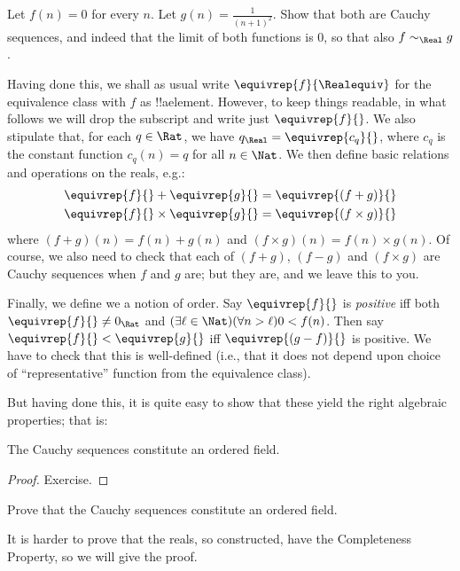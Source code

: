 \begin{prob}
Let $f(n) = 0$ for every $n$. Let $g(n) = \frac{1}{(n+1)^2}$. Show
that both are Cauchy sequences, and indeed that the limit of both
functions is $0$, so that also $f \sim_\Real g$. 
\end{prob}

Having done this, we shall as usual write $\equivrep{f}{\Realequiv}$
for the equivalence class with $f$ as !!a{element}. However, to keep
things readable, in what follows we will drop the subscript and write
just $\equivrep{f}{}$. We also stipulate that, for each $q \in \Rat$,
we have $q_{\Real} = \equivrep{c_{q}}{}$, where $c_{q}$ is the
constant function $c_q(n) = q$ for all $n \in \Nat$. We then define
basic relations and operations on the reals, e.g.:
\begin{align*}
	\equivrep{f}{} + \equivrep{g}{} &= 	\equivrep{(f + g)}{} \\
	\equivrep{f}{} \times 	\equivrep{g}{} &= \equivrep{(f \times g)}{} 
\end{align*}
where $(f + g)(n) = f(n) + g(n)$ and $(f \times g)(n) = f(n) \times
g(n)$. Of course, we also need to check that each of  $(f + g)$,
$(f-g)$ and $(f\times g)$ are Cauchy sequences when $f$ and $g$ are;
but they are, and we leave this to you.

Finally, we define we a notion of order. Say $\equivrep{f}{}$ is
\emph{positive} iff both $\equivrep{f}{}\neq 0_\Rat$ and $(\exists
\ell \in \Nat)(\forall n > \ell)0 < f(n)$. Then say $\equivrep{f}{} <
\equivrep{g}{}$ iff $\equivrep{(g - f)}{}$ is positive. We have to
check that this is well-defined (i.e., that it does not depend upon
choice of ``representative'' function from the equivalence class). 




But having done this, it is quite easy to show that these yield the
right algebraic properties; that is:
\begin{thm}
The Cauchy sequences constitute an ordered field.
\end{thm}

\begin{proof}
Exercise. 
\end{proof}

\begin{prob}
Prove that the Cauchy sequences constitute an ordered field.
\end{prob}

It is harder to prove that the reals, so constructed, have the
Completeness Property, so we will give the proof.

